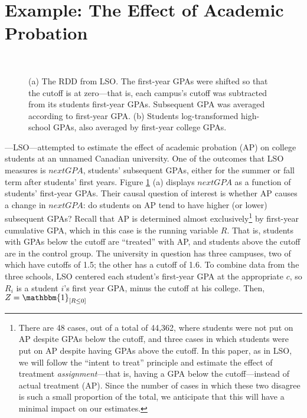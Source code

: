 \documentclass[12pt]{article}
\newcommand{\indicator}[1]{\mathbbm{1}_{\left[ {#1} \right] }}
\begin{document}
\section{Example: The Effect of Academic Probation}


\begin{figure}[htb]
\centering
\mbox{
\quad
{}
}
\caption{(a) The RDD from LSO. The first-year GPAs were shifted so
  that the cutoff is at zero---that is, each campus's
 cutoff was subtracted from its students first-year GPAs. Subsequent
 GPA was averaged according to first-year GPA. (b) Students
 log-transformed high-school GPAs, also averaged by first-year college
 GPAs.}
\label{LSO}
\end{figure}

\citet{lindo2010ability}---LSO---attempted to estimate the effect of
academic probation (AP) on college students at an unnamed
Canadian university.
One of the outcomes that LSO measures is $nextGPA$, students'
subsequent GPAs, either for the summer or fall term after students'
first years.
Figure \ref{LSO} (a) displays $nextGPA$ as a function of students'
first-year GPAs.
Their causal question of interest is whether AP causes a change in
$nextGPA$: do students on AP tend to have higher (or lower) subsequent
GPAs?
Recall that AP is determined almost exclusively\footnote{There are 48
  cases, out of a total of 44,362, where students were not put on AP
  despite GPAs below the cutoff, and three cases in which students
  were put on AP despite having GPAs above the cutoff. In this paper,
  as in LSO, we will follow the ``intent to treat'' principle and
  estimate the effect of treatment \emph{assignment}---that is, having
  a GPA below the cutoff---instead of actual treatment (AP). Since the
  number of cases in which these two disagree is such a small
  proportion of the total, we anticipate that this will have a minimal
  impact on our estimates.}
by first-year cumulative GPA, which in this case is the running
variable $R$.
That is, students with GPAs below the cutoff are ``treated'' with AP,
and students above the cutoff are in the control group.
The university in question has three campuses, two of which have
cutoffs of 1.5; the other has a cutoff of 1.6.
To combine data from the three schools, LSO centered each student's
first-year GPA at the appropriate $c$, so $R_i$ is a student $i$'s
first year GPA, minus the cutoff at his college.
Then, $Z=\indicator{R\le 0}$
\end{document}
